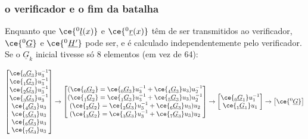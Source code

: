 \subsubsection{o verificador e o fim da batalha}
\label{sec:bullet_fim}

Enquanto que $\ce{^{0}_{\ }\underline{l}(x)}$ e $\ce{^{0}_{\ }\underline{r}(x)}$ têm de ser transmitidos ao verificador, $\ce{^{0}_{\ }\underline{G}}$ e $\ce{^{0}_{\ }\underline{H'}}$ pode ser, e é calculado independentemente pelo verificador.     
Se o $\underline{G}_{k}$ inicial tivesse só 8 elementos (em vez de 64):

\begin{align*}
\begin{bmatrix}
\ce{^{\ }_{0}\underline{G}_{3}}u_{3}^{-1} \\
\ce{^{\ }_{1}\underline{G}_{3}}u_{3}^{-1} \\
\ce{^{\ }_{2}\underline{G}_{3}}u_{3}^{-1} \\
\ce{^{\ }_{3}\underline{G}_{3}}u_{3}^{-1} \\
\ce{^{\ }_{4}\underline{G}_{3}}u_{3} \\
\ce{^{\ }_{5}\underline{G}_{3}}u_{3} \\
\ce{^{\ }_{6}\underline{G}_{3}}u_{3} \\
\ce{^{\ }_{7}\underline{G}_{3}}u_{3} \\
\end{bmatrix}\rightarrow
\begin{bmatrix}
(\ce{^{\ }_{0}\underline{G}_{2}}=\ce{^{\ }_{0}\underline{G}_{3}}u_{3}^{-1} + \ce{^{\ }_{4}\underline{G}_{3}}u_{3})u_{2}^{-1} \\
(\ce{^{\ }_{1}\underline{G}_{2}}=\ce{^{\ }_{1}\underline{G}_{3}}u_{3}^{-1} + \ce{^{\ }_{5}\underline{G}_{3}}u_{3})u_{2}^{-1} \\
(\ce{^{\ }_{2}\underline{G}_{2}}=\ce{^{\ }_{2}\underline{G}_{3}}u_{3}^{-1} + \ce{^{\ }_{6}\underline{G}_{3}}u_{3})u_{2} \\
(\ce{^{\ }_{3}\underline{G}_{2}}=\ce{^{\ }_{3}\underline{G}_{3}}u_{3}^{-1} + \ce{^{\ }_{7}\underline{G}_{3}}u_{3})u_{2} \\
\end{bmatrix}\rightarrow
\begin{bmatrix}
\ce{^{\ }_{0}\underline{G}_{1}}u_{1}^{-1} \\
\ce{^{\ }_{1}\underline{G}_{1}}u_{1} \\
\end{bmatrix}\rightarrow
\begin{bmatrix}
\ce{^{0}_{\ }\underline{G}} \\
\end{bmatrix}
\end{align*}

